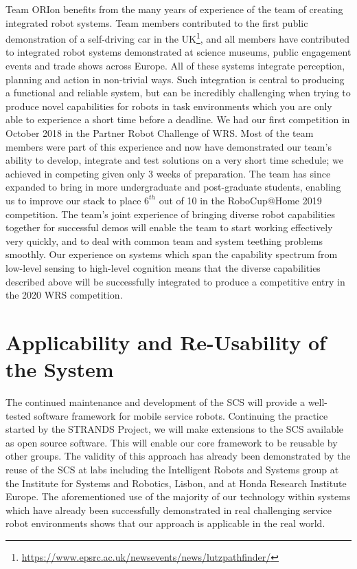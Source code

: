 \documentclass[runningheads,a4paper]{llncs}
\newcommand{\teamori}{Team ORIon}
\begin{document}
\teamori{} benefits from the many years of experience of the team of creating integrated robot systems. Team members contributed to the first public demonstration of a self-driving car in the UK\footnote{\url{https://www.epsrc.ac.uk/newsevents/news/lutzpathfinder/}}, and all members have contributed to integrated robot systems demonstrated at science museums, public engagement events and trade shows across Europe. All of these systems integrate perception, planning and action in non-trivial ways. Such integration is central to producing a functional and reliable system, but can be incredibly challenging when trying to produce novel capabilities for robots in task environments which you are only able to experience a short time before a deadline. We had our
first competition in October 2018 in the Partner Robot Challenge of WRS. 
Most of the team members were part of this experience and now have demonstrated
our team's ability to develop, integrate and test solutions on a very short
time schedule; we achieved in competing given only 3 weeks of preparation. The team has since expanded to bring in more undergraduate and post-graduate students, enabling us to improve our stack to place $6^{th}$ out of 10 in the RoboCup@Home 2019 competition.
The team's joint experience of bringing diverse robot capabilities together for successful demos will enable the team to start working effectively very quickly, and to deal with common team and system teething problems smoothly. Our experience on systems which span the capability spectrum from low-level sensing to high-level cognition means that the diverse capabilities described above will be successfully integrated to produce a competitive entry in the 2020 WRS competition.


\section{Applicability and Re-Usability of the System}




The continued maintenance and development of the SCS will provide a well-tested software framework for mobile service robots. Continuing the practice started by the STRANDS Project, we will make extensions to the SCS available as open source software. This will enable our core framework to be reusable by other groups. The validity of this approach has already been demonstrated by the reuse of the SCS at labs including the Intelligent Robots and Systems group at the Institute for Systems and Robotics, Lisbon, and at Honda Research Institute Europe. The aforementioned use of the majority of our technology within systems which have already been successfully demonstrated in real challenging service robot environments shows that our approach is applicable in the real world.
\end{document}
